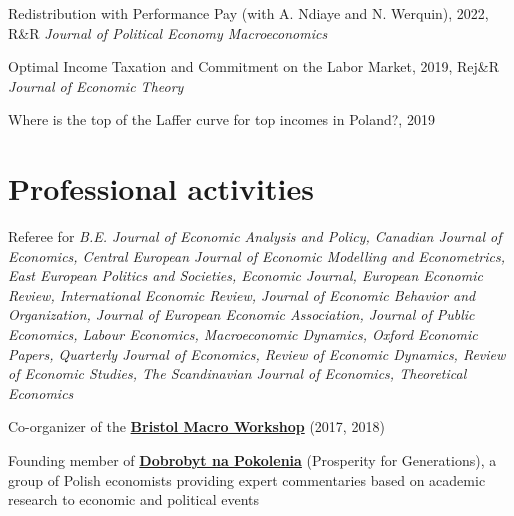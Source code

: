 \documentclass[letterpaper]{article}
\renewenvironment{itemize}{
  \begin{list}{}{
    \setlength{\leftmargin}{1.5em}
  }
}{
  \end{list}
}
\begin{document}
\begin{itemize}
\item Redistribution with Performance Pay (with A. Ndiaye and N. Werquin), 2022, R\&R \textit{Journal of Political Economy Macroeconomics}
\item Optimal Income Taxation and Commitment on the Labor Market, 2019, Rej\&R \textit{Journal of Economic Theory}
\item Where is the top of the Laffer curve for top incomes in Poland?, 2019
\end{itemize}



\section*{Professional activities}
\begin{itemize}
\item Referee for \textit{B.E. Journal of Economic Analysis and Policy, Canadian Journal of Economics, Central European Journal of Economic Modelling and Econometrics, East European Politics and Societies, Economic Journal, European Economic Review, International Economic Review, Journal of Economic Behavior and Organization, Journal of European Economic Association, Journal of Public Economics, Labour Economics, Macroeconomic Dynamics, Oxford Economic Papers, Quarterly Journal of Economics, Review of Economic Dynamics, Review of Economic Studies, The Scandinavian Journal of Economics, Theoretical Economics}

\item Co-organizer of the \href{http://pdoligalski.github.io/BristolMacro/index.html}{\textbf{Bristol Macro Workshop}} (2017, 2018)
\item Founding member of \href{https://napokolenia.pl}{\textbf{Dobrobyt na Pokolenia}} (Prosperity for Generations), a group of Polish economists providing expert commentaries based on academic research
 to economic and political events 
\end{itemize}
\end{document}
